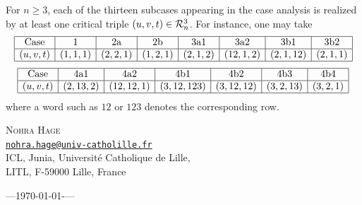 \documentclass[a4paper, twoside, 11pt, english]{article}
\begin{document}
\begin{remark}
\label{R:AllCasesRealized}
For $n\geq 3$, each of the thirteen subcases appearing in the case analysis is
realized by at least one critical triple $(u,v,t)\in\mathcal{R}_n^3$. For instance, one
may take
\[
\begin{array}{|c|c|c|c|c|c|c|c|}
\hline\text{Case}
& 1 & 2\mathrm a & 2\mathrm b
& 3\mathrm{a1} & 3\mathrm{a2} & 3\mathrm{b1} & 3\mathrm{b2}
\\ \hline
(u,v,t)
& (1,1,1)
& (2,2,1)
& (1,2,1)
& (2,1,2)
& (12,1,2)
& (2,1,12)
& (2,1,1)\\\hline
\end{array}
\]
\[
\begin{array}{|c|c|c|c|c|c|c|}
\hline
\text{Case}
& 4\mathrm{a1} & 4\mathrm{a2}
& 4\mathrm{b1} & 4\mathrm{b2} & 4\mathrm{b3} & 4\mathrm{b4}
\\ \hline
(u,v,t)
& (2,13,2)
& (12,12,1)
& (3,12,123)
& (3,12,12)
& (3,2,13)
& (3,2,1)\\\hline
\end{array}
\]
where a word such as $12$ or $123$ denotes the corresponding row.
\end{remark}

\quad

\begin{small}
\renewcommand{\refname}{\Large\textsc{References}}


\end{small}

\vfill
\begin{flushright}
\begin{small}
\noindent\textsc{Nohra Hage}\\
\href{mailto:nohra.hage@univ-catholille.fr}
     {\nolinkurl{nohra.hage@univ-catholille.fr}}\\
ICL, Junia, Université Catholique de Lille,\\
LITL, F-59000 Lille, France
\end{small}
\end{flushright}

\vspace{0.25cm}

\begin{small}---\;\;\today\;\;-\;\;\hhmm\;\;---\end{small} \hfill
\end{document}

